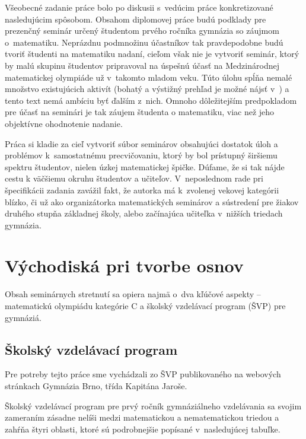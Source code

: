 Všeobecné zadanie práce bolo po diskusii s~vedúcim práce konkretizované nasledujúcim spôsobom. Obsahom diplomovej práce budú podklady pre prezenčný seminár určený študentom prvého ročníka gymnázia so záujmom o~matematiku. Neprázdnu podmnožinu účastníkov tak pravdepodobne budú tvoriť študenti na matematiku nadaní, cieľom však nie je vytvoriť seminár, ktorý by malú skupinu študentov pripravoval na úspešnú účasť na Medzinárodnej matematickej olympiáde už v~takomto mladom veku. Túto úlohu spĺňa nemalé množstvo existujúcich aktivít (bohatý a výstižný prehľad je možné nájsť v~\cite{svrcek2014}) a tento text nemá ambíciu byť ďalším z~nich. Omnoho dôležitejším predpokladom pre účasť na seminári je tak záujem študenta o matematiku, viac než jeho objektívne ohodnotenie nadanie.

Práca si kladie za cieľ vytvoriť súbor seminárov obsahujúci dostatok úloh a problémov k~samostatnému precvičovaniu, ktorý by bol prístupný širšiemu spektru študentov, nielen úzkej matematickej špičke. Dúfame, že si tak nájde cestu k väčšiemu okruhu študentov a učiteľov. V~neposlednom rade pri špecifikácii zadania zavážil fakt, že autorka má k~zvolenej vekovej kategórii blízko, či už ako organizátorka matematických seminárov a sústredení pre žiakov druhého stupňa základnej školy, alebo začínajúca učiteľka v~nižších triedach gymnázia.

\section*{Východiská pri tvorbe osnov}
Obsah seminárnych stretnutí sa opiera najmä o~dva kľúčové aspekty -- matematickú olympiádu kategórie C a školský vzdelávací program (ŠVP) pre gymnáziá.

\subsection*{Školský vzdelávací program}

Pre potreby tejto práce sme vychádzali zo ŠVP publikovaného na webových stránkach Gymnázia Brno, třída Kapitána Jaroše.

Školský vzdelávací program pre prvý ročník gymnáziálneho vzdelávania sa svojim zameraním zásadne nelíši medzi matematickou a nematematickou triedou a zahŕňa štyri oblasti, ktoré sú podrobnejšie popísané v~nasledujúcej tabuľke.


